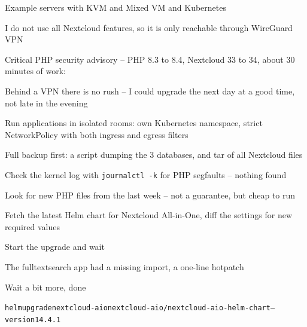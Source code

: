 \documentclass[Screen16to9,17pt]{foils}
\begin{document}

Example servers with KVM and Mixed VM and Kubernetes


I do not use all Nextcloud features, so it is only reachable through WireGuard VPN


Critical PHP security advisory -- PHP 8.3 to 8.4, Nextcloud 33 to 34, about 30 minutes of work:
\begin{list2}
\item Behind a VPN there is no rush -- I could upgrade the next day at a good time, not late in the evening
\item Run applications in isolated rooms: own Kubernetes namespace, strict NetworkPolicy with both ingress and egress filters
\item Full backup first: a script dumping the 3 databases, and tar of all Nextcloud files
\item Check the kernel log with \verb+journalctl -k+ for PHP segfaults -- nothing found
\item Look for new PHP files from the last week -- not a guarantee, but cheap to run
\item Fetch the latest Helm chart for Nextcloud All-in-One, diff the settings for new required values
\item Start the upgrade and wait
\item The fulltextsearch app had a missing import, a one-line hotpatch\\
\item Wait a bit more, done
\end{list2}

\begin{alltt}\footnotesize
helm upgrade nextcloud-aio nextcloud-aio/nextcloud-aio-helm-chart --version 14.4.1
\end{alltt}

\end{document}
